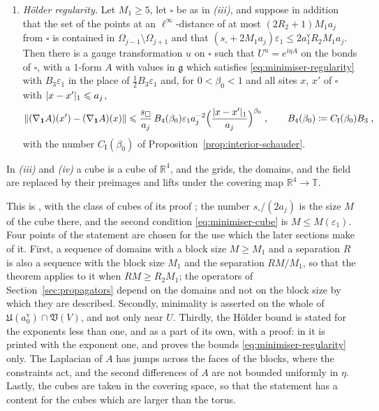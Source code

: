 \documentclass[11pt]{preprint}
\newcommand{\id}{\mathbf 1}
\DeclarePairedDelimiter{\abs}{\lvert}{\rvert}
\DeclarePairedDelimiter{\norm}{\lVert}{\rVert}
\numberwithin{equation}{section}
\begin{document}
\begin{theorem}
\begin{enumerate}[label=(\roman*)]
\begin{equation}
\begin{gathered}
\end{gathered}
\end{equation}
\item \emph{H\"older regularity.} Let $M_1 \geqslant 5$, let $\square$ be as in \emph{(iii)}, and suppose in addition that the set of the points at an $\ell^\infty$-distance of at most $(2R_2 + 1)M_1a_j$ from $\square$ is contained in $\Omega_{j-1} \setminus \Omega_{j+1}$ and that $(s_\square + 2M_1a_j)\varepsilon_1 \leqslant 2a^{\mathrm v}_1R_2M_1a_j$. Then there is a gauge transformation $u$ on $\square$ such that $U^u = e^{i\eta A}$ on the bonds of $\square$, with a $1$-form $A$ with values in $\mathfrak g$ which satisfies \eqref{eq:minimiser-regularity} with $B_3\varepsilon_1$ in the place of $\frac{1}{2}B_3\varepsilon_1$ and, for $0 < \beta_0 < 1$ and all sites $x$, $x'$ of $\square$ with $\abs{x - x'}_1 \leqslant a_j$,
\begin{equation}\label{eq:minimiser-holder}
    \norm{(\nabla_{\id}A)(x') - (\nabla_{\id}A)(x)} \leqslant \frac{s_\square}{a_j}\,B_4(\beta_0)\varepsilon_1a_j^{-2}\Bigl(\frac{\abs{x - x'}_1}{a_j}\Bigr)^{\beta_0}\;,
    \qquad
    B_4(\beta_0) \coloneqq C_{\mathrm I}(\beta_0)B_3\;,
\end{equation}
with the number $C_{\mathrm I}(\beta_0)$ of Proposition~\ref{prop:interior-schauder}.
\end{enumerate}
In \emph{(iii)} and \emph{(iv)} a cube is a cube of $\mathbb R^4$, and the grids, the domains, and the field are replaced by their preimages and lifts under the covering map $\mathbb R^4 \to \mathbb T$.
\end{theorem}

This is \cite[Theorem~1, p.~279]{BalabanVAR}, with the class of cubes of its proof \cite[p.~300]{BalabanVAR}; the number $s_\square/(2a_j)$ is the size $M$ of the cube there, and the second condition \eqref{eq:minimiser-cube} is $M \leqslant M(\varepsilon_1)$. Four points of the statement are chosen for the use which the later sections make of it. First, a sequence of domains with a block size $M \geqslant M_1$ and a separation $R$ is also a sequence with the block size $M_1$ and the separation $RM/M_1$, so that the theorem applies to it when $RM \geqslant R_2M_1$; the operators of Section~\ref{sec:propagators} depend on the domains and not on the block size by which they are described. Secondly, minimality is asserted on the whole of $\mathfrak U(a^{\mathrm v}_0) \cap \mathfrak V(V)$, and not only near $U$. Thirdly, the H\"older bound is stated for the exponents less than one, and as a part of its own, with a proof: in \cite[Theorem~1]{BalabanVAR} it is printed with the exponent one, and \cite[Sect.~F]{BalabanVAR} proves the bounds \eqref{eq:minimiser-regularity} only. The Laplacian of $A$ has jumps across the faces of the blocks, where the constraints act, and the second differences of $A$ are not bounded uniformly in $\eta$. Lastly, the cubes are taken in the covering space, so that the statement has a content for the cubes which are larger than the torus.
\end{document}
